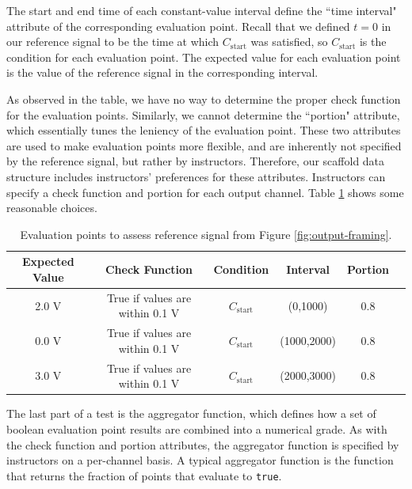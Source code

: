 \documentclass[12pt]{article}
\begin{document}
The start and end time of each constant-value interval define the ``time interval" attribute of the corresponding evaluation point.  Recall that we defined $t=0$ in our reference signal to be the time at which $C_{\text{start}}$ was satisfied, so $C_{\text{start}}$ is the condition for each evaluation point.  The expected value for each evaluation point is the value of the reference signal in the corresponding interval.

As observed in the table, we have no way to determine the proper check function for the evaluation points.  Similarly, we cannot determine the ``portion" attribute, which essentially tunes the leniency of the evaluation point.  These two attributes are used to make evaluation points more flexible, and are inherently not specified by the reference signal, but rather by instructors.  Therefore, our scaffold data structure includes instructors' preferences for these attributes.  Instructors can specify a check function and portion for each output channel.  Table \ref{table:construct-points-2} shows some reasonable choices.

\begin{table}[ht]
\begin{center}
\caption{Evaluation points to assess reference signal from Figure \ref{fig:output-framing}.}
\vspace{2mm}
\label{table:construct-points-2}
\begin{tabular}{cccccc}
Expected Value & Check Function & Condition & Interval & Portion \\ \hline
2.0 V & True if values are within 0.1 V & $C_{\text{start}}$ & (0,1000) & 0.8 \\
0.0 V & True if values are within 0.1 V & $C_{\text{start}}$ & (1000,2000) & 0.8 \\
3.0 V & True if values are within 0.1 V & $C_{\text{start}}$ & (2000,3000) & 0.8 \\ \hline
\end{tabular}
\end{center}
\end{table}

The last part of a test is the aggregator function, which defines how a set of boolean evaluation point results are combined into a numerical grade.  As with the check function and portion attributes, the aggregator function is specified by instructors on a per-channel basis.  A typical aggregator function is the function that returns the fraction of points that evaluate to \texttt{true}.
\end{document}
